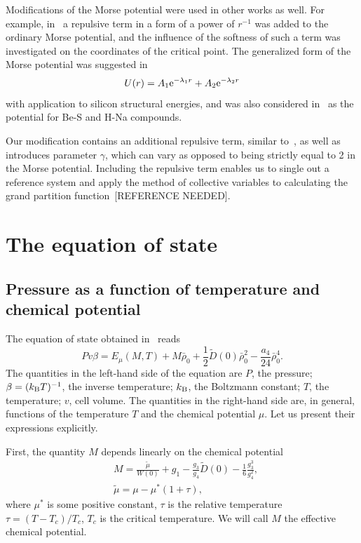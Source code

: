 \documentclass[12pt]{article}
\begin{document}
	Modifications of the Morse potential were used in other works as well. For example, in~\cite{MartinezValenciaEtAl2013} a repulsive term in a form of a power of $r^{-1}$ was added to the ordinary Morse potential, and the influence of the softness of such a term was investigated on the coordinates of the critical point. The generalized form of the Morse potential was suggested in~\cite{BiswasHamann1985}
	\begin{equation}
		U(r) = A_1 {\rm e}^{-\lambda_1 r} + A_2 {\rm e}^{-\lambda_2 r}
	\end{equation} 
	with application to silicon structural energies, and was also considered in~\cite{Lim2005} as the potential for Be-S and H-Na compounds.
	
	Our modification contains an additional repulsive term, similar to~\cite{MartinezValenciaEtAl2013}, as well as introduces parameter $\gamma$, which can vary as opposed to being strictly equal to 2 in the Morse potential. Including the repulsive term enables us to single out a reference system and apply the method of collective variables to calculating the grand partition function~[REFERENCE NEEDED].
	
	\section{\label{sec:eos}The equation of state}
	\subsection{Pressure as a function of temperature and chemical potential}
	The equation of state obtained in~\cite[see Eq.(42)]{KozlovskiiDobush2020} reads
	\begin{equation}
		\label{eq:eosMT}
		Pv\beta = E_\mu(M, T) + M \bar \rho_0 + \frac{1}{2} \tilde D(0) \bar \rho_0^2 - \frac{a_4}{24} \bar \rho_0^4.
	\end{equation}
	The quantities in the left-hand side of the equation are $P$, the pressure; $\beta = (k_{\rm B} T)^{-1}$, the inverse temperature; $k_{\rm B}$, the Boltzmann constant; $T$, the temperature; $v$, cell volume. The quantities in the right-hand side are, in general, functions of the temperature $T$ and the chemical potential $\mu$. Let us present their expressions explicitly.
	
	First, the quantity $M$ depends linearly on the chemical potential
	\begin{align}\label{chem_pot}
		&	M = \frac{\tilde\mu}{W(0)} + g_1 - \frac{g_3}{g_4} \tilde D(0) - \frac{1}{6} \frac{g_3^3}{g_4^2}, \\
		&	\tilde\mu=\mu-\mu^*(1+\tau),
	\end{align}
	where $\mu^*$ is some positive constant, $\tau$ is the relative temperature $\tau = (T - T_c) / T_c$, $T_c$ is the critical temperature. We will call $M$ the effective chemical potential.
	
\end{document}
